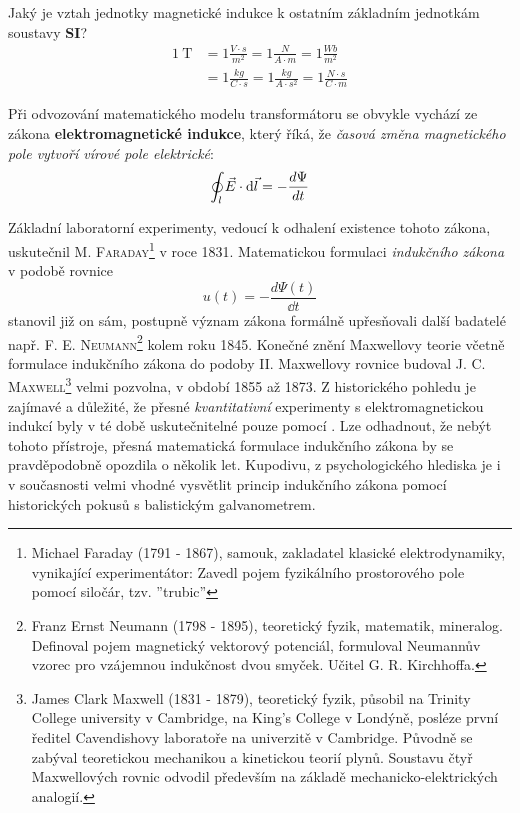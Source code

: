     \begin{mdframed}[style=mdnote]
      Jaký je vztah jednotky magnetické indukce k ostatním základním jednotkám soustavy \textbf{SI}? 
      \begin{align*}
        \SI{1}{\tesla}
          &= 1\frac{V\cdot s}{m^2} = 1\frac{N}{A\cdot m} = 1\frac{Wb}{m^2}          \\
          &= 1\frac{kg}{C\cdot s} = 1\frac{kg}{A\cdot s^2} = 1\frac{N\cdot s}{C \cdot m}
      \end{align*}
    \end{mdframed}
    
    Při odvozování matematického modelu transformátoru se obvykle vychází ze zákona 
    \textbf{elektromagnetické indukce}, který říká, že \emph{časová změna magnetického pole vytvoří 
    vírové pole elektrické}:
    \begin{equation}\label{es:eq_ind_z}
      \oint_l \vec{E} \cdot \mathop{}\!\mathrm{d}\vec{l} = - \dfrac{d \Psi}{d t}
    \end{equation}
     
    Základní laboratorní experimenty, vedoucí k odhalení existence tohoto zákona, uskutečnil 
    \textsc{M. Faraday}\footnote{Michael Faraday (1791 - 1867), samouk, zakladatel klasické 
    elektrodynamiky, vynikající experimentátor: Zavedl pojem fyzikálního prostorového pole pomocí 
    siločár, tzv. ''trubic''} v roce 1831. Matematickou formulaci \emph{indukčního zákona} v podobě 
    rovnice
    \begin{equation}\label{ES:eq_zakl_elm25}
      u(t) = - \frac{d\Psi(t)}{\dd{t}}
    \end{equation} 
    stanovil již on sám, postupně význam zákona formálně upřesňovali další badatelé např. \textsc{F.
    E. Neumann}\footnote{Franz Ernst Neumann (1798 - 1895), teoretický fyzik, matematik, mineralog.
    Definoval pojem magnetický vektorový potenciál, formuloval Neumannův vzorec pro vzájemnou
    indukčnost dvou smyček. Učitel G. R. Kirchhoffa.} kolem roku 1845. Konečné znění Maxwellovy
    teorie včetně formulace indukčního zákona do podoby II. Maxwellovy rovnice budoval \textsc{J. C.
    Maxwell}\footnote{James Clark Maxwell (1831 - 1879), teoretický fyzik, působil na Trinity
    College university v Cambridge, na King's College v Londýně, posléze první ředitel Cavendishovy
    laboratoře na univerzitě v Cambridge. Původně se zabýval teoretickou mechanikou a kinetickou
    teorií plynů. Soustavu čtyř Maxwellových rovnic odvodil především na základě
    mechanicko-elektrických analogií.} velmi pozvolna, v období 1855 až 1873. Z historického pohledu
    je zajímavé a důležité, že přesné \emph{kvantitativní} experimenty s elektromagnetickou indukcí
    byly v té době uskutečnitelné pouze pomocí \wikiGalvanometer. Lze odhadnout, že nebýt tohoto
    přístroje, přesná matematická formulace indukčního zákona by se pravděpodobně opozdila o několik
    let. Kupodivu, z psychologického hlediska je i v současnosti velmi vhodné vysvětlit princip
    indukčního zákona pomocí historických pokusů s balistickým galvanometrem.
    
